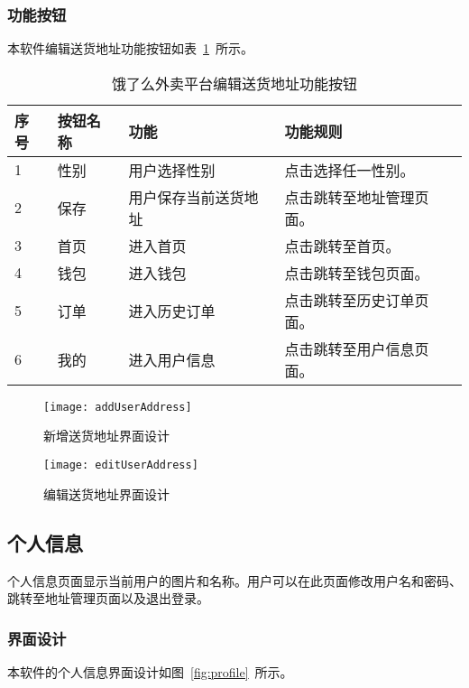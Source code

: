 \subsubsection{功能按钮}
本软件编辑送货地址功能按钮如表~\ref{tab:table15}~所示。
\begin{table}[htbp]
    \caption{饿了么外卖平台编辑送货地址功能按钮}\label{tab:table15}
    \vspace{0.5em}\wuhao
    \begin{tabularx}{\textwidth}{lllX}
    \toprule[1.5pt]
    序号 & 按钮名称 & 功能 & 功能规则 \\ 
    \midrule[1pt]
    1 & 性别 & 用户选择性别 & 点击选择任一性别。 \\
    2 & 保存 & 用户保存当前送货地址 & 点击跳转至地址管理页面。 \\
    3 & 首页 & 进入首页 & 点击跳转至首页。 \\
    4 & 钱包 & 进入钱包 & 点击跳转至钱包页面。 \\
    5 & 订单 & 进入历史订单 & 点击跳转至历史订单页面。 \\
    6 & 我的 & 进入用户信息 & 点击跳转至用户信息页面。 \\
\bottomrule[1.5pt]
\end{tabularx}
\vspace{\baselineskip}
\end{table}
\begin{figure}[htbp]
    \centering
    \begin{minipage}{0.4\textwidth}
    \centering
    \texttt{[image: addUserAddress]}
    \caption{新增送货地址界面设计}\label{fig:addUserAddress}
    \end{minipage}
    \begin{minipage}{0.4\textwidth}
    \centering
    \texttt{[image: editUserAddress]}
    \caption{编辑送货地址界面设计}\label{fig:editUserAddress}
    \end{minipage}
    \vspace{\baselineskip}
\end{figure}

\subsection{个人信息}
个人信息页面显示当前用户的图片和名称。用户可以在此页面修改用户名和密码、跳转至地址管理页面以及退出登录。
\subsubsection{界面设计}
本软件的个人信息界面设计如图~\ref{fig:profile}~所示。
